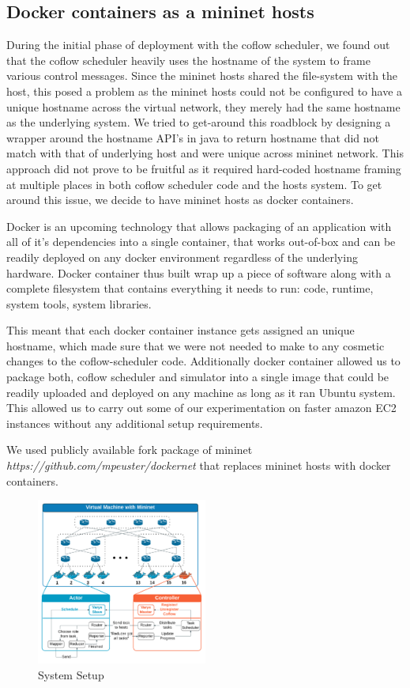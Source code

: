 \documentclass[conference]{IEEEtran}
\begin{document}
\subsection{Docker containers as a mininet hosts}
During the initial phase of deployment with the coflow scheduler, we found out that the coflow scheduler heavily uses the hostname of the system to frame various control messages. Since the mininet hosts shared the file-system with the host, this posed a problem as the mininet hosts could not be configured to have a unique hostname across the virtual network, they merely had the same hostname as the underlying system. We tried to get-around this roadblock by designing a wrapper around the hostname API’s in java to return hostname that did not match with that of underlying host and were unique across mininet network. This approach did not prove to be fruitful as it required hard-coded hostname framing  at multiple places in both coflow scheduler code and the hosts system.  To get around this issue, we decide to have mininet hosts as docker containers.

Docker is an upcoming technology that allows packaging of an application with all of it’s dependencies into a single container, that works out-of-box and can be readily deployed on any docker environment regardless of the underlying hardware. Docker container thus built wrap up a piece of software along with a complete filesystem that contains everything it needs to run: code, runtime, system tools, system libraries. 

This meant that each docker container instance gets assigned an unique hostname, which made sure that we were not needed to make to any cosmetic changes to the coflow-scheduler code. Additionally  docker container allowed us to package both, coflow scheduler and simulator into a single image that could be readily uploaded and deployed on any machine as long as it ran Ubuntu system. This allowed us to carry out some of our experimentation on faster amazon EC2 instances without any additional setup requirements.

We used publicly available fork package of mininet \textit{https://github.com/mpeuster/dockernet}\cite{dockernet} that replaces mininet hosts with docker containers.

\begin{figure}
\includegraphics[width=0.5\textwidth]{setup.png}\caption{System Setup}
\end{figure}
\end{document}
